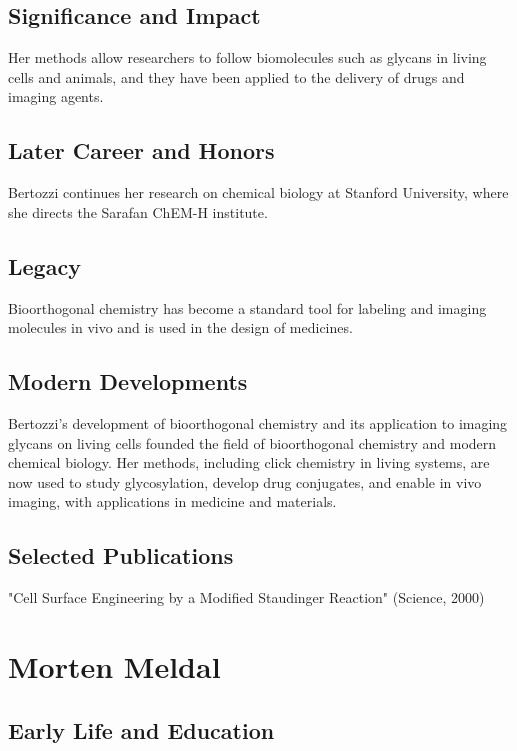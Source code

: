 \subsection*{Significance and Impact}

Her methods allow researchers to follow biomolecules such as glycans in living cells and animals, and they have been applied to the delivery of drugs and imaging agents.

\subsection*{Later Career and Honors}

Bertozzi continues her research on chemical biology at Stanford University, where she directs the Sarafan ChEM-H institute.

\subsection*{Legacy}

Bioorthogonal chemistry has become a standard tool for labeling and imaging molecules in vivo and is used in the design of medicines.

\subsection*{Modern Developments}

Bertozzi's development of bioorthogonal chemistry and its application to imaging glycans on living cells founded the field of bioorthogonal chemistry and modern chemical biology. Her methods, including click chemistry in living systems, are now used to study glycosylation, develop drug conjugates, and enable in vivo imaging, with applications in medicine and materials.

\subsection*{Selected Publications}

"Cell Surface Engineering by a Modified Staudinger Reaction" (Science, 2000)

\clearpage

\section{Morten Meldal}

\subsection*{Early Life and Education}

